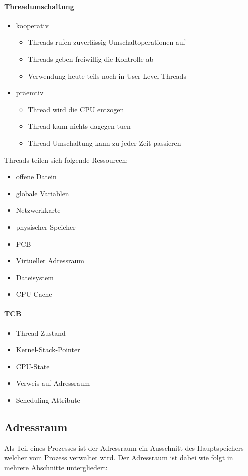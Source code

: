 \documentclass[12pt,a4paper]{article}
\begin{document}
\paragraph{Threadumschaltung}
\begin{itemize}
\item kooperativ
\begin{itemize}
\item Threads rufen zuverlässig Umschaltoperationen auf
\item Threads geben freiwillig die Kontrolle ab
\item Verwendung heute teils noch in User-Level Threads
\end{itemize}
\item präemtiv
\begin{itemize}
\item Thread wird die CPU entzogen
\item Thread kann nichts dagegen tuen
\item Thread Umschaltung kann zu jeder Zeit passieren
\end{itemize}
\end{itemize}
Threads teilen sich folgende Ressourcen:
\begin{itemize}
\item offene Datein
\item globale Variablen
\item Netzwerkkarte
\item physischer Speicher
\item PCB
\item Virtueller Adressraum
\item Dateisystem
\item CPU-Cache
\end{itemize}
\paragraph{TCB}
\begin{itemize}
\item Thread Zustand
\item Kernel-Stack-Pointer
\item CPU-State
\item Verweis auf Adressraum
\item Scheduling-Attribute
\end{itemize}

\subsection{Adressraum}
Als Teil eines Prozesses ist der Adressraum ein Ausschnitt des Hauptspeichers welcher vom Prozess verwaltet wird. Der Adressraum ist dabei wie folgt in mehrere Abschnitte untergliedert:
\end{document}
